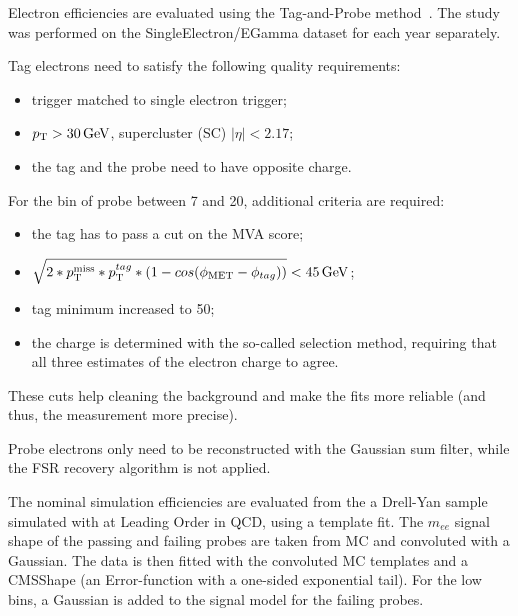 Electron efficiencies are evaluated using the Tag-and-Probe method~\cite{CMS-EWK-10-005}.
The study was performed on the SingleElectron/EGamma dataset for each year separately.

Tag electrons need to satisfy the following quality requirements:
\begin{itemize}
\item trigger matched to single electron trigger;
\item $p_{\mathrm{T}} > 30 \,\text{Ge\hspace{-.08em}V}$, supercluster (SC) $|\eta| < 2.17$;%
\item the tag and the probe need to have opposite charge.
\end{itemize}

For the bin of probe \pt between 7 and 20\GeV, additional criteria are required:
\begin{itemize}
\item the tag has to pass a cut on the MVA score;
\item $\sqrt{2*p_{\mathrm{T}}^\text{miss}*p_{\mathrm{T}}^{tag}*(1-cos(\phi_{\rm MET}-\phi_{tag}))} < 45 \,\text{Ge\hspace{-.08em}V}$;
\item tag minimum \pt increased to 50\GeV;
\item the charge is determined with the so-called selection method, requiring that all three estimates of the electron charge to agree.
\end{itemize}
These cuts help cleaning the background and make the fits more reliable (and thus, the measurement more precise).

Probe electrons only need to be reconstructed with the Gaussian sum filter, while the FSR recovery algorithm is not applied.

The nominal simulation efficiencies are evaluated from the a Drell-Yan sample simulated with \MADGRAPH at Leading Order in QCD,
using a template fit.
The $m_{ee}$ signal shape of the passing and failing probes are taken from MC and convoluted with a Gaussian.
The data is then fitted with the convoluted MC templates and a CMSShape (an Error-function with a one-sided exponential tail).
For the low \pt bins, a Gaussian is added to the signal model for the failing probes.


